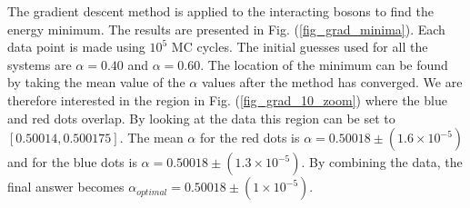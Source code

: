 The gradient descent method is applied to the interacting bosons to find the energy minimum. The results are presented in Fig. (\ref{fig_grad_minima}). Each data point is made using $10^5$ MC cycles. The initial guesses used for all the systems are $\alpha = 0.40$ and $\alpha = 0.60$. The location of the minimum can be found by taking the mean value of the $\alpha$ values after the method has converged. We are therefore interested in the region in Fig. (\ref{fig_grad_10_zoom}) where the blue and red dots overlap. By looking at the data this region can be set to $[0.50014, 0.500175]$. The mean $\alpha$ for the red dots is $\alpha = 0.50018 \pm (1.6\times 10^{-5})$ and for the blue dots is $\alpha = 0.50018 \pm (1.3\times10^{-5})$. By combining the data, the final answer becomes $\alpha_{optimal} = 0.50018 \pm (1\times10^{-5})$. 


